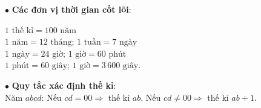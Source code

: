 \documentclass[14pt,a4paper,oneside]{extbook}
\begin{document}
\begin{minipage}[t]{0.49\textwidth}
  \begin{tcolorbox}[
    enhanced,
    title={\footnotesize\bfseries\color{white}\faClockO\ 2. Thời gian \& Kĩ thuật đổi},
    colback=teal!2!white,
    colframe=teal!75!black,
    arc=2.5mm, boxrule=0.8pt, top=1.8mm, bottom=1.8mm, left=2mm, right=2mm
  ]
    \footnotesize
    $\bullet$ \textbf{Các đơn vị thời gian cốt lõi}:
    \begin{center}
      $1\text{ thế kỉ} = 100\text{ năm}$\\
      $1\text{ năm} = 12\text{ tháng}$; $1\text{ tuần} = 7\text{ ngày}$\\
      $1\text{ ngày} = 24\text{ giờ}$; $1\text{ giờ} = 60\text{ phút}$\\
      $1\text{ phút} = 60\text{ giây}$; $1\text{ giờ} = 3\,600\text{ giây}$.
    \end{center}
    $\bullet$ \textbf{Quy tắc xác định thế kỉ}:\\
    Năm $abcd$: Nếu $cd = 00 \Rightarrow$ thế kỉ $ab$. Nếu $cd \ne 00 \Rightarrow$ thế kỉ $ab + 1$.
  \end{tcolorbox}
\end{minipage}

\vspace{2mm}
\end{document}
